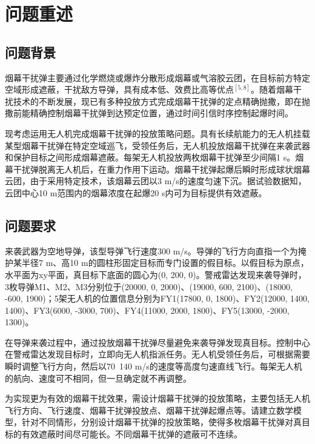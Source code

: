 \documentclass[12pt,a4paper]{article}
\begin{document}
\newpage

\section{问题重述}

\subsection{问题背景}

\indent 烟幕干扰弹主要通过化学燃烧或爆炸分散形成烟幕或气溶胶云团，在目标前方特定空域形成遮蔽，干扰敌方导弹，具有成本低、效费比高等优点$^{[5,8]}$。随着烟幕干扰技术的不断发展，现已有多种投放方式完成烟幕干扰弹的定点精确抛撒，即在抛撒前能精确控制烟幕干扰弹到达预定位置，通过时间引信时序控制起爆时间。

\indent 现考虑运用无人机完成烟幕干扰弹的投放策略问题。具有长续航能力的无人机挂载某型烟幕干扰弹在特定空域巡飞，受领任务后，无人机投放烟幕干扰弹在来袭武器和保护目标之间形成烟幕遮蔽。每架无人机投放两枚烟幕干扰弹至少间隔1 s。烟幕干扰弹脱离无人机后，在重力作用下运动。烟幕干扰弹起爆后瞬时形成球状烟幕云团，由于采用特定技术，该烟幕云团以3 m/s的速度匀速下沉。据试验数据知，云团中心10 m范围内的烟幕浓度在起爆20 s内可为目标提供有效遮蔽。

\subsection{问题要求}

\indent 来袭武器为空地导弹，该型导弹飞行速度300 m/s。导弹的飞行方向直指一个为掩护某半径7 m、高10 m的圆柱形固定目标而专门设置的假目标。以假目标为原点，水平面为xy平面，真目标下底面的圆心为(0, 200, 0)。警戒雷达发现来袭导弹时，3枚导弹M1、M2、M3分别位于(20000, 0, 2000)、(19000, 600, 2100)、(18000, -600, 1900)；5架无人机的位置信息分别为FY1(17800, 0, 1800)、FY2(12000, 1400, 1400)、FY3(6000, -3000, 700)、FY4(11000, 2000, 1800)、FY5(13000, -2000, 1300)。

\indent 在导弹来袭过程中，通过投放烟幕干扰弹尽量避免来袭导弹发现真目标。控制中心在警戒雷达发现目标时，立即向无人机指派任务。无人机受领任务后，可根据需要瞬时调整飞行方向，然后以70~140 m/s的速度等高度匀速直线飞行。每架无人机的航向、速度可不相同，但一旦确定就不再调整。

\indent 为实现更为有效的烟幕干扰效果，需设计烟幕干扰弹的投放策略，主要包括无人机飞行方向、飞行速度、烟幕干扰弹投放点、烟幕干扰弹起爆点等。请建立数学模型，针对不同情形，分别设计烟幕干扰弹的投放策略，使得多枚烟幕干扰弹对真目标的有效遮蔽时间尽可能长。不同烟幕干扰弹的遮蔽可不连续。
\end{document}
